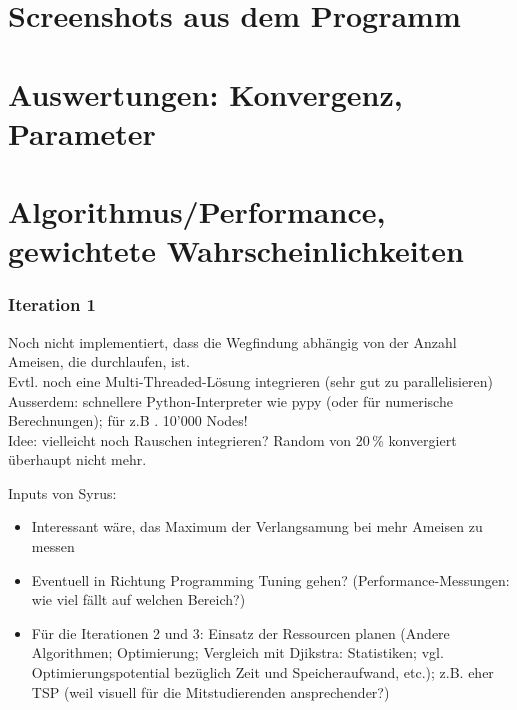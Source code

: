 \section{Screenshots aus dem Programm}


\vspace*{1cm}


\section{Auswertungen: Konvergenz, Parameter}


\vspace*{1cm}


\section{Algorithmus/Performance, gewichtete Wahrscheinlichkeiten}


\vspace*{1cm}


\subsubsection*{Iteration 1}

Noch nicht implementiert, dass die Wegfindung abhängig von der Anzahl Ameisen, die durchlaufen, ist. \\

Evtl. noch eine Multi-Threaded-Lösung integrieren (sehr gut zu parallelisieren) \\

Ausserdem: schnellere Python-Interpreter wie pypy (oder für numerische Berechnungen); für z.B . 10'000 Nodes! \\

Idee: vielleicht noch Rauschen integrieren? Random von 20\,\% konvergiert überhaupt nicht mehr.

\vspace*{3cm}


Inputs von Syrus: \\

\begin{itemize}
\item Interessant wäre, das Maximum der Verlangsamung bei mehr Ameisen zu messen
\item Eventuell in Richtung Programming Tuning gehen? (Performance-Messungen: wie viel fällt auf welchen Bereich?) 
\item Für die Iterationen 2 und 3: Einsatz der Ressourcen planen (Andere Algorithmen; Optimierung; Vergleich mit Djikstra: Statistiken; vgl. Optimierungspotential bezüglich Zeit und Speicheraufwand, etc.); z.B. eher TSP (weil visuell für die Mitstudierenden ansprechender?) 
\end{itemize}